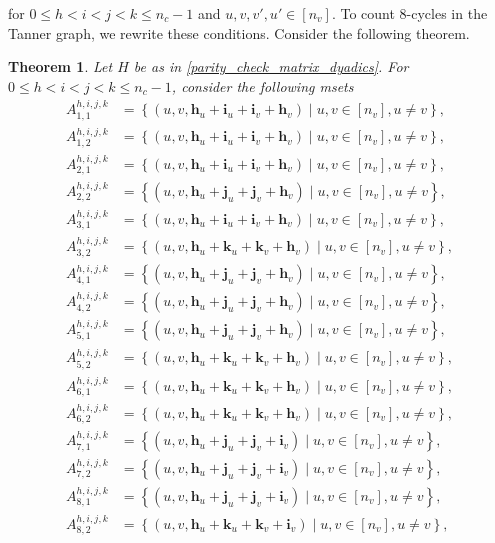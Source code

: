 \documentclass[11pt]{article}
\newtheorem{theorem}[lemma]{Theorem}
\theoremstyle{plain}
\theoremstyle{plain}
\theoremstyle{definition}
\numberwithin{theo}{section}
\newcommand{\bh}{{\mathbf h}}
\newcommand{\bi}{{\mathbf i}}
\newcommand{\bj}{{\mathbf j}}
\newcommand{\bk}{{\mathbf k}}
\begin{document}
\noindent for $0\leq h<i<j<k\leq n_c-1$ and $u,v,v',u'\in[n_v]$. 
To count 8-cycles in the Tanner graph, we rewrite these conditions. Consider the following theorem.
\begin{theorem}
\label{counting_cycles_thm_8cycles_ncxnv_dyadics}
Let $H$ be as in \eqref{parity_check_matrix_dyadics}. For $0\leq h<i<j<k\leq n_c-1$, consider the following msets
\begin{align*}
A_{1,1}^{h,i,j,k} &= \left\{(u,v,\bh_u+\bi_u+\bi_v+\bh_v)\mid u,v\in[n_v], u\neq v\right\}, \\
A_{1,2}^{h,i,j,k} &= \left\{(u,v,\bh_u+\bi_u+\bi_v+\bh_v)\mid u,v\in[n_v], u\neq v\right\}, \\
A_{2,1}^{h,i,j,k} &= \left\{(u,v,\bh_u+\bi_u+\bi_v+\bh_v)\mid u,v\in[n_v], u\neq v\right\}, \\
A_{2,2}^{h,i,j,k} &= \left\{(u,v,\bh_u+\bj_u+\bj_v+\bh_v)\mid u,v\in[n_v], u\neq v\right\}, \\
A_{3,1}^{h,i,j,k} &= \left\{(u,v,\bh_u+\bi_u+\bi_v+\bh_v)\mid u,v\in[n_v], u\neq v\right\}, \\
A_{3,2}^{h,i,j,k} &= \left\{(u,v,\bh_u+\bk_u+\bk_v+\bh_v)\mid u,v\in[n_v], u\neq v\right\}, \\
A_{4,1}^{h,i,j,k} &= \left\{(u,v,\bh_u+\bj_u+\bj_v+\bh_v)\mid u,v\in[n_v], u\neq v\right\}, \\
A_{4,2}^{h,i,j,k} &= \left\{(u,v,\bh_u+\bj_u+\bj_v+\bh_v)\mid u,v\in[n_v], u\neq v\right\}, \\
A_{5,1}^{h,i,j,k} &= \left\{(u,v,\bh_u+\bj_u+\bj_v+\bh_v)\mid u,v\in[n_v], u\neq v\right\}, \\
A_{5,2}^{h,i,j,k} &= \left\{(u,v,\bh_u+\bk_u+\bk_v+\bh_v)\mid u,v\in[n_v], u\neq v\right\}, \\
A_{6,1}^{h,i,j,k} &= \left\{(u,v,\bh_u+\bk_u+\bk_v+\bh_v)\mid u,v\in[n_v], u\neq v\right\}, \\
A_{6,2}^{h,i,j,k} &= \left\{(u,v,\bh_u+\bk_u+\bk_v+\bh_v)\mid u,v\in[n_v], u\neq v\right\}, \\
A_{7,1}^{h,i,j,k} &= \left\{(u,v,\bh_u+\bj_u+\bj_v+\bi_v)\mid u,v\in[n_v], u\neq v\right\}, \\
A_{7,2}^{h,i,j,k} &= \left\{(u,v,\bh_u+\bj_u+\bj_v+\bi_v)\mid u,v\in[n_v], u\neq v\right\}, \\
A_{8,1}^{h,i,j,k} &= \left\{(u,v,\bh_u+\bj_u+\bj_v+\bi_v)\mid u,v\in[n_v], u\neq v\right\}, \\
A_{8,2}^{h,i,j,k} &= \left\{(u,v,\bh_u+\bk_u+\bk_v+\bi_v)\mid u,v\in[n_v], u\neq v\right\}, \\

\end{align*}
\end{theorem}
\end{document}
